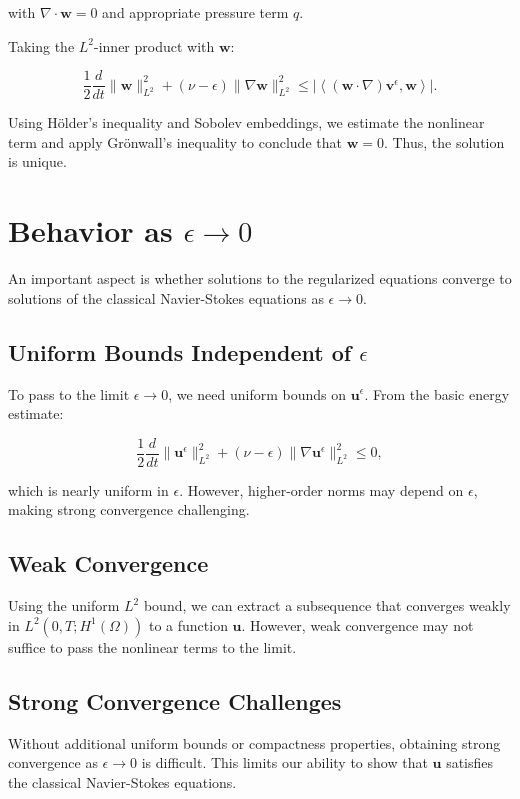 \documentclass[12pt]{article}
\begin{document}
with \(\nabla \cdot \mathbf{w} = 0\) and appropriate pressure term \(q\).

Taking the \(L^2\)-inner product with \(\mathbf{w}\):

\[
\frac{1}{2} \frac{d}{dt} \|\mathbf{w}\|_{L^2}^2 + (\nu - \epsilon) \|\nabla \mathbf{w}\|_{L^2}^2 \leq \left| \left\langle (\mathbf{w} \cdot \nabla)\mathbf{v}^\epsilon, \mathbf{w} \right\rangle \right|.
\]

Using Hölder's inequality and Sobolev embeddings, we estimate the nonlinear term and apply Grönwall's inequality to conclude that \(\mathbf{w} = 0\). Thus, the solution is unique.

\section{Behavior as \(\epsilon \to 0\)}
An important aspect is whether solutions to the regularized equations converge to solutions of the classical Navier-Stokes equations as \(\epsilon \to 0\).

\subsection{Uniform Bounds Independent of \(\epsilon\)}
To pass to the limit \(\epsilon \to 0\), we need uniform bounds on \(\mathbf{u}^\epsilon\). From the basic energy estimate:

\[
\frac{1}{2} \frac{d}{dt} \|\mathbf{u}^\epsilon\|_{L^2}^2 + (\nu - \epsilon) \|\nabla \mathbf{u}^\epsilon\|_{L^2}^2 \leq 0,
\]

which is nearly uniform in \(\epsilon\). However, higher-order norms may depend on \(\epsilon\), making strong convergence challenging.

\subsection{Weak Convergence}
Using the uniform \(L^2\) bound, we can extract a subsequence that converges weakly in \(L^2(0, T; H^1(\Omega))\) to a function \(\mathbf{u}\). However, weak convergence may not suffice to pass the nonlinear terms to the limit.

\subsection{Strong Convergence Challenges}
Without additional uniform bounds or compactness properties, obtaining strong convergence as \(\epsilon \to 0\) is difficult. This limits our ability to show that \(\mathbf{u}\) satisfies the classical Navier-Stokes equations.
\end{document}
